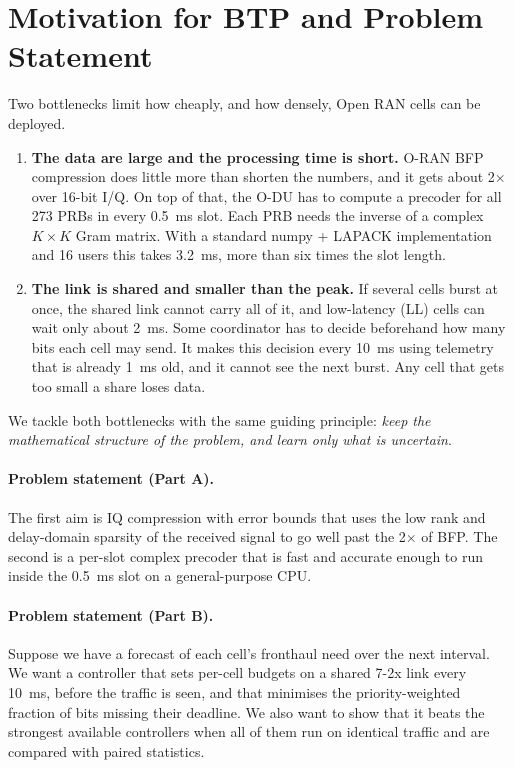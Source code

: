 \section{Motivation for BTP and Problem Statement}

Two bottlenecks limit how cheaply, and how densely, Open RAN cells can be deployed.
\begin{enumerate}
  \item \textbf{The data are large and the processing time is short.} O-RAN BFP compression does little more than shorten the numbers, and it gets about 2$\times$ over 16-bit I/Q. On top of that, the O-DU has to compute a precoder for all 273 PRBs in every 0.5~ms slot. Each PRB needs the inverse of a complex $K\times K$ Gram matrix. With a standard numpy + LAPACK implementation and 16 users this takes 3.2~ms, more than six times the slot length.
  \item \textbf{The link is shared and smaller than the peak.} If several cells burst at once, the shared link cannot carry all of it, and low-latency (LL) cells can wait only about 2~ms. Some coordinator has to decide beforehand how many bits each cell may send. It makes this decision every 10~ms using telemetry that is already 1~ms old, and it cannot see the next burst. Any cell that gets too small a share loses data.
\end{enumerate}

We tackle both bottlenecks with the same guiding principle: \emph{keep the mathematical structure of the problem, and learn only what is uncertain}.

\paragraph{Problem statement (Part A).} The first aim is IQ compression with error bounds that uses the low rank and delay-domain sparsity of the received signal to go well past the 2$\times$ of BFP. The second is a per-slot complex precoder that is fast and accurate enough to run inside the 0.5~ms slot on a general-purpose CPU.

\paragraph{Problem statement (Part B).} Suppose we have a forecast of each cell's fronthaul need over the next interval. We want a controller that sets per-cell budgets on a shared 7-2x link every 10~ms, before the traffic is seen, and that minimises the priority-weighted fraction of bits missing their deadline. We also want to show that it beats the strongest available controllers when all of them run on identical traffic and are compared with paired statistics.


